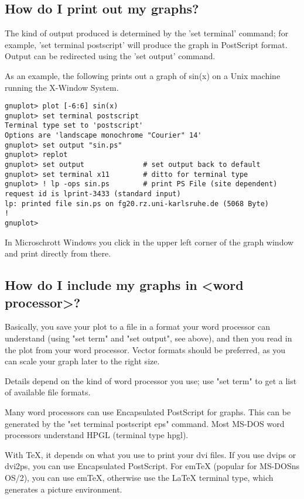 \documentclass[a4paper,11pt]{article}
\begin{document}
\subsection{How do I print out my graphs?}

The kind of output produced is determined by the 'set terminal'
command; for example, 'set terminal postscript' will produce
the graph in PostScript format. Output can be redirected using
the 'set output' command.

As an example, the following prints out a graph of sin(x) on a
Unix machine running the X-Window System.

\begin{verbatim}
gnuplot> plot [-6:6] sin(x)
gnuplot> set terminal postscript
Terminal type set to 'postscript'
Options are 'landscape monochrome "Courier" 14'
gnuplot> set output "sin.ps"
gnuplot> replot
gnuplot> set output              # set output back to default
gnuplot> set terminal x11        # ditto for terminal type
gnuplot> ! lp -ops sin.ps        # print PS File (site dependent)
request id is lprint-3433 (standard input)
lp: printed file sin.ps on fg20.rz.uni-karlsruhe.de (5068 Byte)
!
gnuplot>
\end{verbatim}

In Microschrott Windows you click in the upper left
corner of the graph window and print directly from there.


\subsection{How do I include my graphs in <word processor>?}

Basically, you save your plot to a file in a format your word
processor can understand (using "set term" and "set output",
see above), and then you read in the plot from your word
processor. Vector formats should be preferred, as you can scale
your graph later to the right size.

Details depend on the kind of word processor you use; use "set
term" to get a list of available file formats.

Many word processors can use Encapsulated PostScript for
graphs. This can be generated by the "set terminal postscript
eps" command. Most MS-DOS word processors understand HPGL
(terminal type hpgl).

With TeX, it depends on what you use to print your dvi files.
If you use dvips or dvi2ps, you can use Encapsulated
PostScript. For emTeX (popular for MS-DOSns OS/2), you can use emTeX,
otherwise use the \LaTeX{} terminal type, which generates a
picture environment.
\end{document}
